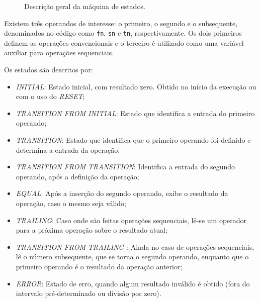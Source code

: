 \documentclass[a4paper,11pt]{article}
\begin{document}
\begin{figure}[!htb]
\caption{Descrição geral da máquina de estados.}
\label{fig:fsm}
\end{figure}

Existem três operandos de interesse: o primeiro, o segundo e o subsequente, denominados no código como \texttt{fn}, \texttt{sn} e \texttt{tn}, respectivamente. Os dois primeiros definem as operações convencionais e o terceiro é utilizado como uma variável auxiliar para operações sequenciais.

Os estados são descritos por:

\begin{itemize}
	\item \textit{INITIAL}: Estado inicial, com resultado zero. Obtido no início da execução ou com o uso do \textit{RESET};
	\item \textit{TRANSITION FROM INITIAL}: Estado que identifica a entrada do primeiro operando;
	\item \textit{TRANSITION}: Estado que identifica que o primeiro operando foi definido e determina a entrada da operação;
	\item \textit{TRANSITION FROM TRANSITION}: Identifica a entrada do segundo operando, após a definição da operação;
	\item \textit{EQUAL}: Após a inserção do segundo operando, exibe o resultado da operação, caso o mesmo seja válido;
	\item \textit{TRAILING}: Caso onde são feitas operações sequenciais, lê-se um operador para a próxima operação sobre o resultado atual;
	\item \textit{TRANSITION FROM TRAILING }: Ainda no caso de operações sequenciais, lê o número subsequente, que se torna o segundo operando, enquanto que o primeiro operando é o resultado da operação anterior;
	\item \textit{ERROR}: Estado de erro, quando algum resultado inválido é obtido (fora do intervalo pré-determinado ou divisão por zero).
\end{itemize}
\end{document}

